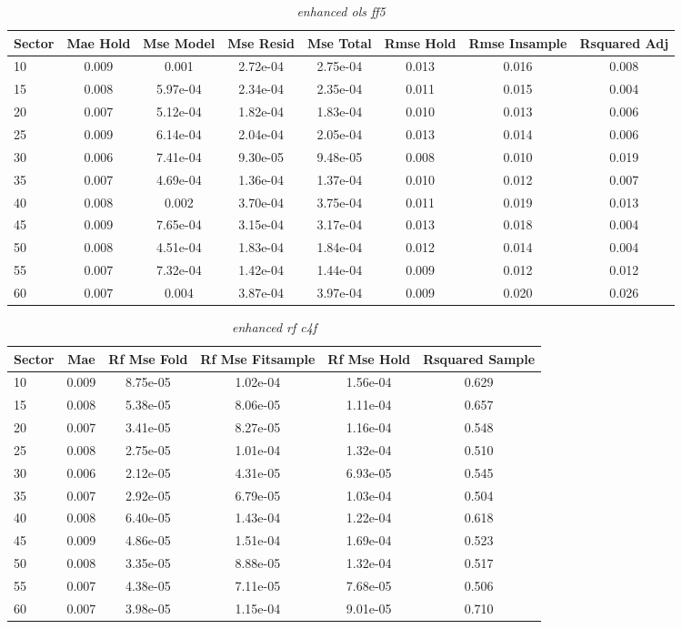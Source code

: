 \begin{table}[H]
\caption{\textit{enhanced ols ff5}}\label{tab:enhanced_ols_ff5}
\centering
\begin{tabular}{lccccccc}
\hline\hline
Sector & Mae Hold & Mse Model & Mse Resid & Mse Total & Rmse Hold & Rmse Insample & Rsquared Adj \\ 
\hline
10 & 0.009 & 0.001 & 2.72e-04 & 2.75e-04 & 0.013 & 0.016 & 0.008 \\ 
15 & 0.008 & 5.97e-04 & 2.34e-04 & 2.35e-04 & 0.011 & 0.015 & 0.004 \\ 
20 & 0.007 & 5.12e-04 & 1.82e-04 & 1.83e-04 & 0.010 & 0.013 & 0.006 \\ 
25 & 0.009 & 6.14e-04 & 2.04e-04 & 2.05e-04 & 0.013 & 0.014 & 0.006 \\ 
30 & 0.006 & 7.41e-04 & 9.30e-05 & 9.48e-05 & 0.008 & 0.010 & 0.019 \\ 
35 & 0.007 & 4.69e-04 & 1.36e-04 & 1.37e-04 & 0.010 & 0.012 & 0.007 \\ 
40 & 0.008 & 0.002 & 3.70e-04 & 3.75e-04 & 0.011 & 0.019 & 0.013 \\ 
45 & 0.009 & 7.65e-04 & 3.15e-04 & 3.17e-04 & 0.013 & 0.018 & 0.004 \\ 
50 & 0.008 & 4.51e-04 & 1.83e-04 & 1.84e-04 & 0.012 & 0.014 & 0.004 \\ 
55 & 0.007 & 7.32e-04 & 1.42e-04 & 1.44e-04 & 0.009 & 0.012 & 0.012 \\ 
60 & 0.007 & 0.004 & 3.87e-04 & 3.97e-04 & 0.009 & 0.020 & 0.026 \\ 
\hline
\end{tabular}
\end{table}


\begin{table}[H]
\caption{\textit{enhanced rf c4f}}\label{tab:enhanced_rf_c4f}
\centering
\begin{tabular}{lccccc}
\hline\hline
Sector & Mae & Rf Mse Fold & Rf Mse Fitsample & Rf Mse Hold & Rsquared Sample \\ 
\hline
10 & 0.009 & 8.75e-05 & 1.02e-04 & 1.56e-04 & 0.629 \\ 
15 & 0.008 & 5.38e-05 & 8.06e-05 & 1.11e-04 & 0.657 \\ 
20 & 0.007 & 3.41e-05 & 8.27e-05 & 1.16e-04 & 0.548 \\ 
25 & 0.008 & 2.75e-05 & 1.01e-04 & 1.32e-04 & 0.510 \\ 
30 & 0.006 & 2.12e-05 & 4.31e-05 & 6.93e-05 & 0.545 \\ 
35 & 0.007 & 2.92e-05 & 6.79e-05 & 1.03e-04 & 0.504 \\ 
40 & 0.008 & 6.40e-05 & 1.43e-04 & 1.22e-04 & 0.618 \\ 
45 & 0.009 & 4.86e-05 & 1.51e-04 & 1.69e-04 & 0.523 \\ 
50 & 0.008 & 3.35e-05 & 8.88e-05 & 1.32e-04 & 0.517 \\ 
55 & 0.007 & 4.38e-05 & 7.11e-05 & 7.68e-05 & 0.506 \\ 
60 & 0.007 & 3.98e-05 & 1.15e-04 & 9.01e-05 & 0.710 \\ 
\hline
\end{tabular}
\end{table}


